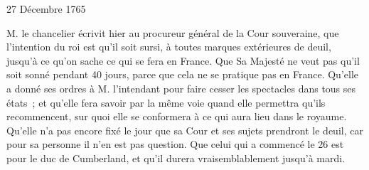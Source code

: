                      \begin{diary}{27 Décembre 1765}{}
                        
                        
                           M. le chancelier écrivit hier
                           au procureur général
                              de la Cour souveraine, que l'intention du roi est
                           qu'il soit sursi, à toutes marques extérieures de
                           deuil, jusqu'à ce qu'on sache ce qui se fera en France.
                           Que Sa Majesté ne veut pas qu'il soit sonné pendant
                           40 jours, parce que cela ne se pratique pas en France.
                           Qu'elle a donné ses ordres à M.
                              l'intendant pour faire
                           cesser les spectacles dans tous ses états ; et qu'elle
                           fera savoir par la même voie quand elle
                           permettra qu'ils recommencent, sur quoi elle
                           se conformera à ce qui aura lieu dans le
                           royaume. Qu'elle n'a pas encore fixé le jour que
                           sa Cour et ses sujets prendront le deuil, car
                           pour sa personne il n'en est pas question.
                           Que celui qui a commencé le 26 est
                           pour
                           le duc de Cumberland,
                           et qu'il durera vraisemblablement
                           jusqu'à mardi. \bigskip
        

\end{diary}
